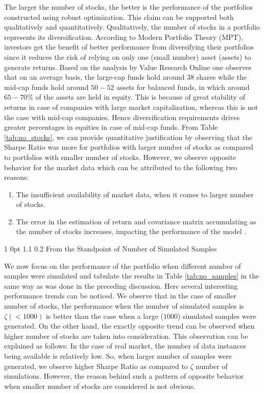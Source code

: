 \documentclass[12pt]{article}
\makeatletter
\numberwithin{equation}{section}
\renewcommand{\subsection}{
  \@startsection
  {subsection}%
  {1}%
  {0pt}%
  {1.1\baselineskip}%
  {0.2\baselineskip}%
  {\sc \centering}%
}
\makeatother
\begin{document}
The larger the number of stocks, the better is the performance of the portfolios constructed using robust optimization. This claim can be supported both qualitatively and quantitatively. Qualitatively, the number of stocks in a portfolio represents its diversification. According to Modern Portfolio Theory (MPT), investors get the benefit of better performance from diversifying their portfolios since it reduces the risk of relying on only one (small number) asset (assets) to generate returns. Based on the analysis by Value Research Online \cite{vro} one observes that on an average basis, the large-cap funds hold around $38$ shares while the mid-cap funds hold around $50-52$ assets for balanced funds, in which around $65-70\%$ of the assets are held in equity. This is because of great stability of returns in case of companies with large market capitalization, whereas this is not the case with mid-cap companies. Hence diversification requirements drives greater percentages in equities in case of mid-cap funds. From Table \ref{tab:no_stocks}, we can provide quantitative justification by observing that the Sharpe Ratio was more for portfolios with larger number of stocks as compared to portfolios with smaller number of stocks. However, we observe opposite behavior for the market data which can be attributed to the following two reasons:
\begin{enumerate}
\item The insufficient availability of market data, when it comes to larger number of stocks.
\item The error in the estimation of return and covariance matrix accumulating as the number of stocks increases, impacting the performance of the model \cite{Michaud89}.
\end{enumerate}

\subsection{From the Standpoint of Number of Simulated Samples}

We now focus on the performance of the portfolio when different number of samples were simulated and tabulate the results in Table \ref{tab:no_samples} in the same way as was done in the preceding discussion. Here several interesting performance trends can be noticed. We observe that in the case of smaller number of stocks, the performance when the number of simulated samples is $\zeta (< 1000)$ is better than the case when a large ($1000$) simulated samples were generated. On the other hand, the exactly opposite trend can be observed when higher number of stocks are taken into consideration. This observation can be explained as follows: In the case of real market, the number of data instances being available is relatively low. So, when larger number of samples were generated, we observe higher Sharpe Ratio as compared to $\zeta$ number of simulations. However, the reason behind such a pattern of opposite behavior when smaller number of stocks are considered is not obvious.
\end{document}

